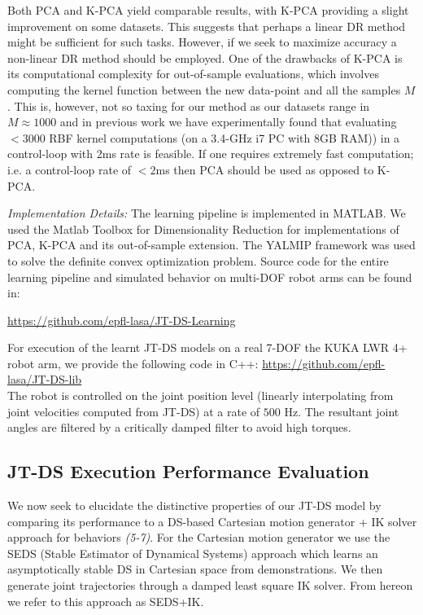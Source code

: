 \documentclass[letterpaper, 10 pt, journal, twoside, fleqn]{IEEEtran}
\begin{document}
Both PCA and K-PCA yield comparable results, with K-PCA providing a slight improvement on some datasets. This suggests that perhaps a linear DR method might be sufficient for such tasks. However, if we seek to maximize accuracy a non-linear DR method should be employed. One of the drawbacks of K-PCA is its computational complexity for out-of-sample evaluations, which involves computing the kernel function between the new data-point and all the samples $M$. This is, however, not so taxing for our method as our datasets range in $M\approx1000$ and in previous work \cite{Mirrazavi:IJRR:2017} we have experimentally found that evaluating $<3000$ RBF kernel computations (on a 3.4-GHz i7 PC with 8GB RAM)) in a control-loop with 2ms rate is feasible. If one requires extremely fast computation; i.e. a control-loop rate of $<2$ms then PCA should be used as opposed to K-PCA.


\textit{Implementation Details:} The learning pipeline is implemented in MATLAB. We used the Matlab Toolbox for Dimensionality Reduction \cite{Maaten08dimensionalityreduction} for implementations of PCA, K-PCA and its out-of-sample extension. The YALMIP framework \cite{lofberg2004yalmip} was used to solve the definite convex optimization problem. Source code for the entire learning pipeline and simulated behavior on multi-DOF robot arms can be found in:
\footnotesize  \centerline{\underline{\url{https://github.com/epfl-lasa/JT-DS-Learning}}}
\normalsize
For execution of the learnt JT-DS models on a real 7-DOF the KUKA LWR 4+ robot arm, we provide the following code in C++:
\footnotesize \underline{\url{https://github.com/epfl-lasa/JT-DS-lib}}\\
\normalsize
The robot is controlled on the joint position level (linearly interpolating from joint velocities computed from JT-DS) at a rate of $ 500 $ Hz. The resultant joint angles are filtered by a critically damped filter to avoid high torques.
\subsection{JT-DS Execution Performance Evaluation}
We now seek to elucidate the distinctive properties of our JT-DS model by comparing its performance to a DS-based Cartesian motion generator + IK solver approach for behaviors \textit{(5-7)}. For the Cartesian motion generator we use the SEDS (Stable Estimator of Dynamical Systems) approach \cite{khansari2011learning} which learns an asymptotically stable DS in Cartesian space from demonstrations. We then generate joint trajectories through a damped least square IK solver. From hereon we refer to this approach as SEDS+IK.
\end{document}
